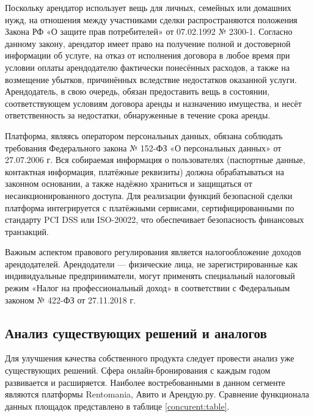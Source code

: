 Поскольку арендатор использует вещь для личных, семейных или домашних нужд, на отношения между участниками сделки распространяются положения Закона РФ «О защите прав потребителей» от 07.02.1992 № 2300-1. Согласно данному закону, арендатор имеет право на получение полной и достоверной информации об услуге, на отказ от исполнения договора в любое время при условии оплаты арендодателю фактически понесённых расходов, а также на возмещение убытков, причинённых вследствие недостатков оказанной услуги. Арендодатель, в свою очередь, обязан предоставить вещь в состоянии, соответствующем условиям договора аренды и назначению имущества, и несёт ответственность за недостатки, обнаруженные в течение срока аренды\cite{zakon1}.

Платформа, являясь оператором персональных данных, обязана соблюдать требования Федерального закона № 152-ФЗ «О персональных данных» от 27.07.2006 г. Вся собираемая информация о пользователях (паспортные данные, контактная информация, платёжные реквизиты) должна обрабатываться на законном основании, а также надёжно храниться и защищаться от несанкционированного доступа\cite{zakon4}. Для реализации функций безопасной сделки платформа интегрируется с платёжными сервисами, сертифицированными по стандарту PCI DSS или ISO-20022, что обеспечивает безопасность финансовых транзакций.

Важным аспектом правового регулирования является налогообложение доходов арендодателей. Арендодатели — физические лица, не зарегистрированные как индивидуальные предприниматели, могут применять специальный налоговый режим «Налог на профессиональный доход» в соответствии с Федеральным законом № 422-ФЗ от 27.11.2018 г\cite{zakon3}.

\subsection{Анализ существующих решений и аналогов}
Для улучшения качества собственного продукта следует провести анализ уже существующих решений. Сфера онлайн-бронирования с каждым годом развивается и расширяется. Наиболее востребованными в данном сегменте являются платформы Rentomania, Авито и Арендую.ру. Сравнение функционала данных площадок представлено в таблице \ref{concurent:table}.

